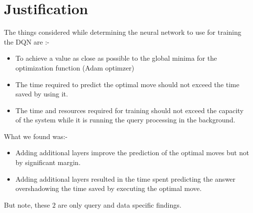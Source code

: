 \section{Justification}
The things considered while determining the neural network to use for training the DQN are :-
\begin{itemize}
    \item To achieve a value as close as possible to the global minima for the optimization function (Adam optimzer)
    \item The time required to predict the optimal move should not exceed the time saved by using it.
    \item The time and resources required for training should not exceed the capacity of the system while it is running the query processing in the background. 
\end{itemize}
What we found was:-
\begin{itemize}
    \item Adding additional layers improve the prediction of the optimal moves but not by significant margin.
    \item Adding additional layers resulted in the time spent predicting the answer overshadowing the time saved by executing the optimal move.
\end{itemize}
\par But note, these $2$ are only query and data specific findings.

